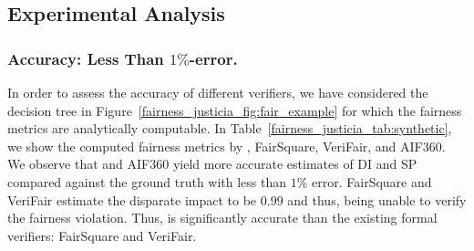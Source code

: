 \subsection{Experimental Analysis}

\subsubsection{Accuracy: Less Than $  1\%$-error.} 
In order to assess the accuracy of different verifiers, we have considered the decision tree in Figure~\ref{fairness_justicia_fig:fair_example} for which the fairness metrics  are analytically computable. 
In Table~\ref{fairness_justicia_tab:synthetic}, we show the computed fairness metrics by {\justicia}, FairSquare, VeriFair, and AIF360. We observe that {\justicia} and AIF360  yield more accurate estimates of DI and SP compared against the ground truth with less than $1\%$ error.
FairSquare and VeriFair  estimate the disparate impact to be $0.99$ and thus, being unable to verify the fairness violation. 
Thus, {\justicia} is significantly accurate than the existing formal verifiers: FairSquare and VeriFair. 

